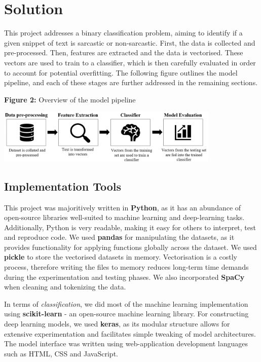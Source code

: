 \documentclass[12pt,a4paper]{article}
\begin{document}
\section{Solution}
\noindent This project addresses a binary classification problem, aiming to identify if a given snippet of text is sarcastic or non-sarcastic. First, the data is collected and pre-processed. Then, features are extracted and the data is vectorised. These vectors are used to train to a classifier, which is then carefully evaluated in order to account for potential overfitting. The following figure outlines the model pipeline, and each of these stages are further addressed in the remaining sections.

\begin{center}
	\textbf{Figure 2:} Overview of the model pipeline
\end{center}
\begin{center}
	\includegraphics[width=0.8\textwidth]{Images/modelpipeline2.png}
	\label{Model Pipeline}
\end{center}

\subsection{Implementation Tools}
\noindent This project was majoritively written in \textbf{Python}, as it has an abundance of open-source libraries well-suited to machine learning and deep-learning tasks. Additionally, Python is very readable, making it easy for others to interpret, test and reproduce code. We used \textbf{pandas} for manipulating the datasets, as it provides functionality for applying functions globally across the dataset. We used \textbf{pickle} to store the vectorised datasets in memory. Vectorisation is a costly process, therefore writing the files to memory reduces long-term time demands during the experimentation and testing phases. We also  incorporated \textbf{SpaCy} when cleaning and tokenizing the data.

In terms of \textit{classification}, we did most of the machine learning implementation using \textbf{scikit-learn} - an open-source machine learning library. For constructing deep learning models, we used \textbf{keras}, as its modular structure allows for extensive experimentation and facilitates simple tweaking of model architectures. The model interface was written using web-application development languages such as HTML, CSS and JavaScript.
\end{document}
